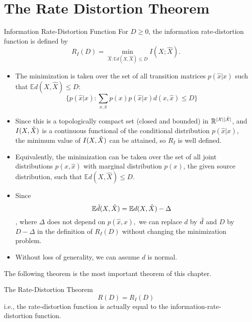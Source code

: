 \documentclass[../main.tex]{subfiles}
\begin{document}
\section{The Rate Distortion Theorem}
\begin{gbox}{Information Rate-Distortion Function}
For $D\geq 0$, the information rate-distortion function is defined by \[
R_I(D)=\min_{\hat X: \mathbb{E}d(X,\hat X)\leq D}I(X;\hat X).
\]
\begin{itemize}
    \item The minimization is taken over the set of all transition matrices $p(\hat x|x)$ such that $\mathbb{E}d(X,\hat X)\leq D$:\[
    \{p(\hat x|x):\sum_{x,\hat x}p(x)p(\hat x|x)d(x,\hat x)\leq D\}
    \]
    \item Since this is a topologically compact set (closed and bounded) in $\mathbb{R}^{|\mathcal{X}||\hat {\mathcal{X}}|}$, and $I(X,\hat X)$ is a continuous functional of the conditional distribution $p(\hat x|x)$, the minimum value of $I(X,\hat X)$ can be attained, so $R_I$ is well defined.
    \item Equivalently, the minimization can be taken over the set of all joint distributions $p(x,\hat x)$ with marginal distribution $p(x)$, the given source distribution, such that $\mathbb{E} d(X,\hat X)\leq D.$
    \item Since \[
    \mathbb{E} \Tilde{d}(X,\hat X) = \mathbb{E} d(X,\hat X) - \Delta
    \], where $\Delta$ does not depend on $p(\hat x, x),$ we can replace $d$ by $\Tilde{d}$ and $D$ by $D-\Delta$ in the definition of $R_I(D)$ without changing the minimization problem.
    \item Without loss of generality, we can assume $d$ is normal.
\end{itemize}
\end{gbox}
The following theorem is the most important theorem of this chapter.
\begin{bbox}{The Rate-Distortion Theorem}
\[
R(D) = R_I(D)
\]
i.e., the rate-distortion function is actually equal to the information-rate-distortion function.
\end{bbox}
\end{document}

